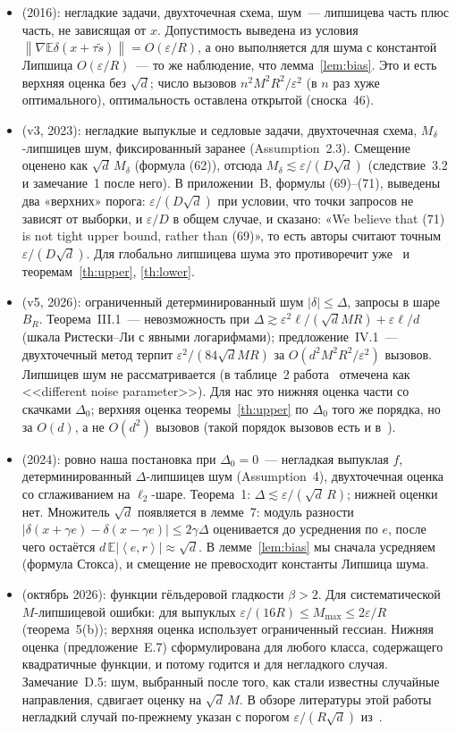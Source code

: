 \documentclass[12pt,a4paper]{article}
\theoremstyle{plain}
\theoremstyle{definition}
\theoremstyle{remark}
\newcommand{\E}{\mathbb{E}}
\newcommand{\eps}{\varepsilon}
\newcommand{\norm}[1]{\left\lVert #1\right\rVert}
\newcommand{\abs}[1]{\left\lvert #1\right\rvert}
\newcommand{\ip}[2]{\left\langle #1,#2\right\rangle}
\begin{document}
\begin{itemize}
  \item \cite[разд.~4]{GDN16} (2016): негладкие задачи, двухточечная схема, шум~--- липшицева часть плюс часть, не зависящая от $x$. Допустимость выведена из условия $\norm{\nabla\E\delta(x+\tau\tilde s)}=O(\eps/R)$, а оно выполняется для шума с константой Липшица $O(\eps/R)$~--- то же наблюдение, что лемма~\ref{lem:bias}. Это и есть верхняя оценка без $\sqrt d$; число вызовов $n^2M^2R^2/\eps^2$ (в $n$ раз хуже оптимального), оптимальность оставлена открытой (сноска~46).
  \item \cite{DTTG23} (v3, 2023): негладкие выпуклые и седловые задачи, двухточечная схема, $M_\delta$-липшицев шум, фиксированный заранее (Assumption~2.3). Смещение оценено как $\sqrt d\,M_\delta$ (формула (62)), отсюда $M_\delta\lesssim\eps/(D\sqrt d)$ (следствие~3.2 и замечание~1 после него). В приложении~B, формулы (69)--(71), выведены два «верхних» порога: $\eps/(D\sqrt d)$ при условии, что точки запросов не зависят от выборки, и $\eps/D$ в общем случае, и сказано: «We believe that (71) is not tight upper bound, rather than (69)», то есть авторы считают точным $\eps/(D\sqrt d)$. Для глобально липшицева шума это противоречит уже~\cite{GDN16} и теоремам~\ref{th:upper}, \ref{th:lower}.
  \item \cite{PPTG} (v5, 2026): ограниченный детерминированный шум $|\delta|\le\Delta$, запросы в шаре $B_R$. Теорема~III.1~--- невозможность при $\Delta\gtrsim\eps^2\ell/(\sqrt dMR)+\eps\ell/d$ (шкала Ристески--Ли с явными логарифмами); предложение~IV.1~--- двухточечный метод терпит $\eps^2/(84\sqrt dMR)$ за $O(d^2M^2R^2/\eps^2)$ вызовов. Липшицев шум не рассматривается (в таблице~2 работа~\cite{LG24} отмечена как <<different noise parameter>>). Для нас это нижняя оценка части со скачками $\Delta_0$; верхняя оценка теоремы~\ref{th:upper} по $\Delta_0$ того же порядка, но за $O(d)$, а не $O(d^2)$ вызовов (такой порядок вызовов есть и в~\cite{DTTG23}).
  \item \cite{LG24} (2024): ровно наша постановка при $\Delta_0=0$~--- негладкая выпуклая $f$, детерминированный $\Delta$-липшицев шум (Assumption~4), двухточечная оценка со сглаживанием на $\ell_2$-шаре. Теорема~1: $\Delta\lesssim\eps/(\sqrt d\,R)$; нижней оценки нет. Множитель $\sqrt d$ появляется в лемме~7: модуль разности $\abs{\delta(x+\gamma e)-\delta(x-\gamma e)}\le2\gamma\Delta$ оценивается до усреднения по $e$, после чего остаётся $d\,\E\abs{\ip er}\approx\sqrt d$. В лемме~\ref{lem:bias} мы сначала усредняем (формула Стокса), и смещение не превосходит константы Липшица шума.
  \item \cite{LDT26} (октябрь 2026): функции гёльдеровой гладкости $\beta>2$. Для систематической $M$-липшицевой ошибки: для выпуклых $\eps/(16R)\le M_{\max}\le2\eps/R$ (теорема~5(b)); верхняя оценка использует ограниченный гессиан. Нижняя оценка (предложение~E.7) сформулирована для любого класса, содержащего квадратичные функции, и потому годится и для негладкого случая. Замечание~D.5: шум, выбранный после того, как стали известны случайные направления, сдвигает оценку на $\sqrt d\,M$. В обзоре литературы этой работы негладкий случай по-прежнему указан с порогом $\eps/(R\sqrt d)$ из~\cite{DTTG23}.
\end{itemize}
\end{document}
